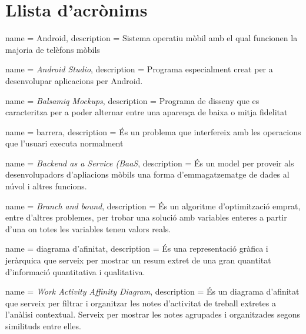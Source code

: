 \chapter*{Llista d'acrònims}
\label{sec:glossary}


\begin{acronym}
\end{acronym}


{
name = Android, description = {Sistema operatiu mòbil amb el qual funcionen la majoria de telèfons mòbils \cite{Android_OS}}
}

{
name = \textit{Android Studio}, description = {Programa especialment creat per a desenvolupar aplicacions per Android.}
}

{
name = \textit{Balsamiq Mockups}, description = {Programa de disseny que es caracteritza per a poder alternar entre una aparença de baixa o mitja fidelitat}
}

{
name = barrera, description = {És un problema que interfereix amb les operacions que l'usuari executa normalment}
}

{
name = \textit{Backend as a Service (BaaS}, description = {És un model per proveir als desenvolupadors d'apliacions mòbils una forma d'emmagatzematge de dades al núvol i altres funcions.}
}

{
name = \textit{Branch and bound}, description = {És un algoritme d'optimització emprat, entre d'altres problemes, per trobar una solució amb variables enteres a partir d'una on totes les variables tenen valors reals.}
}

{
name = diagrama d'afinitat, description = {És una representació gràfica i jeràrquica que serveix per mostrar un resum extret de una gran quantitat d'informació quantitativa i qualitativa.}
}

{
name = \textit{Work Activity Affinity Diagram}, description = {És un diagrama d'afinitat que serveix per filtrar i organitzar les notes d'activitat de treball extretes a l'anàlisi contextual. Serveix per mostrar les notes agrupades i organitzades segons similituds entre elles.}
}

